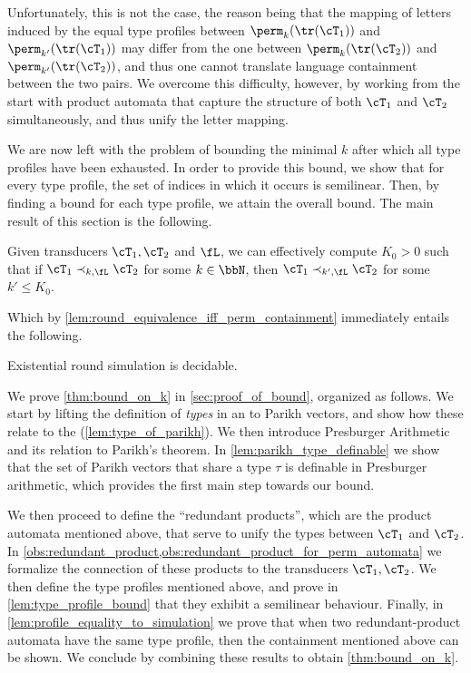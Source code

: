 Unfortunately, this is not the case, the reason being
that the mapping of letters induced by the equal type profiles between $\perm_k(\tr(\cT_1))$ and $\perm_{k'}(\tr(\cT_1))$ may differ from the one between $\perm_k(\tr(\cT_2))$ and $\perm_{k'}(\tr(\cT_2))$, and thus one cannot translate language containment between the two pairs. We overcome this difficulty, however, by working from the start with product automata that capture the structure of both $\cT_1$ and $\cT_2$ simultaneously, and thus unify the letter mapping.

We are now left with the problem of bounding the minimal $k$ after which all type profiles have been exhausted. In order to provide this bound, we show that for every type profile, the set of indices in which it occurs is semilinear. Then, by finding a bound for each type profile, we attain the overall bound. 
The main result of this section is the following.
\begin{theorem}
\label{thm:bound_on_k}	
	Given transducers $\cT_1,\cT_2$ and $\fL$, we can effectively compute $K_0>0$ such that if $\cT_1\prec_{k,\fL} \cT_2$ for some $k\in \bbN$, then $\cT_1\prec_{k',\fL} \cT_2$ for some $k'\le K_0$.
\end{theorem}
Which by \cref{lem:round_equivalence_iff_perm_containment} immediately entails the following.
\begin{corollary}
\label{cor:exist_k_decidable}
Existential round simulation is decidable.
\end{corollary}

We prove \cref{thm:bound_on_k} in \cref{sec:proof_of_bound}, organized as follows. We start by lifting the definition of \emph{types} in an \NFA to Parikh vectors, and show how these relate to the \NFA (\cref{lem:type_of_parikh}). We then introduce Presburger Arithmetic and its relation to Parikh's theorem. In \cref{lem:parikh_type_definable} we show that the set of Parikh vectors that share a type $\tau$ is definable in Presburger arithmetic, which provides the first main step towards our bound.

We then proceed to define the ``redundant products'', which are the product automata mentioned above, that serve to unify the types between $\cT_1$ and $\cT_2$. In \cref{obs:redundant_product,obs:redundant_product_for_perm_automata} we formalize the connection of these products to the transducers $\cT_1,\cT_2$. We then define the type profiles mentioned above, and prove in \cref{lem:type_profile_bound} that they exhibit a semilinear behaviour. Finally, in \cref{lem:profile_equality_to_simulation} we prove that when two redundant-product automata have the same type profile, then the containment mentioned above can be shown. We conclude by combining these results to obtain \cref{thm:bound_on_k}.

